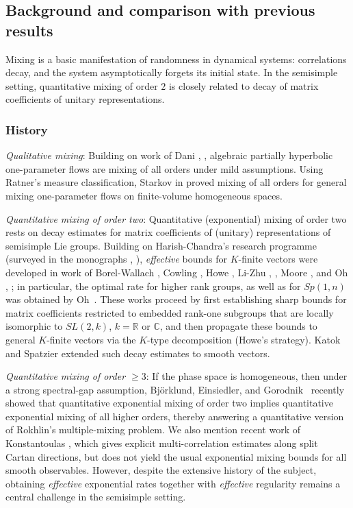 \documentclass[11 pt]{amsart}
\newcommand{\RR}{\mathbb{R}}
\newcommand{\CC}{\mathbb{C}}
\theoremstyle{definition}
\numberwithin{equation}{section}
\begin{document}
\subsection{Background and comparison with previous results}

Mixing is a basic manifestation of randomness in dynamical systems: correlations decay, and the system asymptotically forgets its initial state. In the semisimple setting, quantitative mixing of order \(2\) is closely related to decay of matrix coefficients of unitary representations.

\subsubsection{History} \emph{Qualitative mixing}:
Building on work of Dani \cite{Da1}, \cite{Da2}, algebraic partially hyperbolic one-parameter flows are mixing of all orders under mild assumptions.
 Using Ratner's measure classification, Starkov in \cite{Star} proved mixing
of all orders for general mixing one-parameter flows on finite-volume homogeneous spaces.


\emph{Quantitative mixing of order two}: Quantitative (exponential) mixing of order two rests on decay estimates for matrix coefficients of (unitary) representations of semisimple Lie groups. Building on Harish-Chandra's research programme (surveyed in the
monographs \cite{Warner}, \cite{Warner1}), \emph{effective} bounds for $K$-finite vectors were developed in work of Borel-Wallach \cite{Borel}, Cowling \cite{Cowling}, Howe \cite{Howe}, Li-Zhu \cite{Li}, \cite{Li1}, Moore \cite{Moore}, and Oh \cite{Oh1}, \cite{oh};  in particular, the optimal rate for higher rank groups, as well as for $Sp(1,n)$ was obtained by Oh~\cite{oh}. These works proceed by first establishing sharp bounds for matrix coefficients restricted to embedded rank-one subgroups that are locally isomorphic to $SL(2,k)$, $k=\RR$ or $\CC$, and then propagate these bounds to general $K$-finite vectors via the $K$-type decomposition (Howe's strategy). Katok and Spatzier \cite{Spatzier1} extended such decay estimates to smooth vectors.











\emph{Quantitative mixing of order $\ge 3$}:   If the phase space is homogeneous, then under a strong spectral-gap assumption, Bj{\"o}rklund, Einsiedler, and Gorodnik~\cite{BEG} recently showed that quantitative exponential mixing of order two implies quantitative exponential mixing of all higher orders, thereby answering a quantitative version of Rokhlin's multiple-mixing problem. We also mention recent work of Konstantoulas \cite{Konstantoulas}, which gives explicit multi-correlation estimates along split Cartan directions, but does not yield the usual exponential mixing bounds for all smooth observables. However, despite the extensive history of the subject, obtaining \emph{effective} exponential rates together with \emph{effective} regularity remains a central challenge in the semisimple setting.
\end{document}
